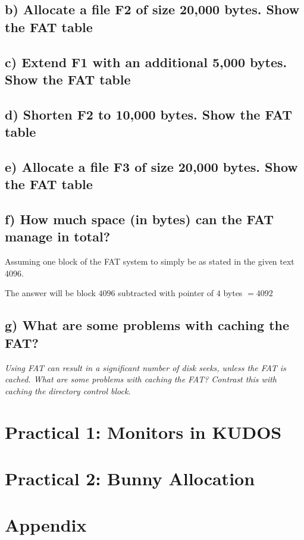 \documentclass[11pt,a4paper]{article}
\theoremstyle{plain}
\theoremstyle{definition}
\theoremstyle{remark}
\numberwithin{equation}{section}
\begin{document}
\subsection*{b) Allocate a file F2 of size 20,000 bytes. Show the FAT table}




\subsection*{c) Extend F1 with an additional 5,000 bytes. Show the FAT table}




\subsection*{d) Shorten F2 to 10,000 bytes. Show the FAT table}





\subsection*{e) Allocate a file F3 of size 20,000 bytes. Show the FAT table}




\subsection*{f) How much space (in bytes) can the FAT manage in total?}
Assuming one block of the FAT system to simply be as stated in the given text 4096.

The answer will be block $4096$ subtracted with pointer of $4$ bytes $= 4092$




\subsection*{g) What are some problems with caching the FAT?}
\textit{Using FAT can result in a significant number of disk seeks, unless the FAT is cached. What are some problems with caching the FAT? Contrast this with caching the directory control block.}


\section*{Practical 1: Monitors in KUDOS}




\section*{Practical 2: Bunny Allocation}



\section*{Appendix}




%
%
\end{document}
